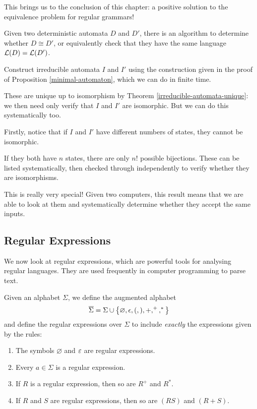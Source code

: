 \documentclass{article}
\begin{document}
This brings us to the conclusion of this chapter: a positive solution to the equivalence problem for regular grammars!

\begin{theorem}
	Given two deterministic automata $D$ and $D'$, there is an algorithm to determine whether $D \cong D'$, or equivalently check that they have the same language $\mathcal{L}(D) = \mathcal{L}(D')$.
\end{theorem}

\begin{prf}
	Construct irreducible automata $I$ and $I'$ using the construction given in the proof of Proposition \ref{minimal-automaton}, which we can do in finite time.
	    
	These are unique up to isomorphism by Theorem \ref{irreducible-automata-unique}: we then need only verify that $I$ and $I'$ are isomorphic. But we can do this systematically too.
	    
	Firstly, notice that if $I$ and $I'$ have different numbers of states, they cannot be isomorphic.
	    
	If they both have $n$ states, there are only $n!$ possible bijections. These can be listed systematically, then checked through independently to verify whether they are isomorphisms.
\end{prf}

\begin{note}
	This is really very special! Given two computers, this result means that we are able to look at them and systematically determine whether they accept the same inputs.
\end{note}

\subsection{Regular Expressions}

We now look at regular expressions, which are powerful tools for analysing regular languages. They are used frequently in computer programming to parse text.

\begin{definition}
	Given an alphabet $\Sigma$, we define the augmented alphabet
	\[
		\overline \Sigma = \Sigma \cup \left\lbrace \varnothing, \epsilon, (, ), +, ^+, ^* \right\rbrace
	\]
	and define the regular expressions over $\Sigma$ to include \textit{exactly} the expressions given by the rules:
	\begin{enumerate}
		\item The symbols $\varnothing$ and $\varepsilon$ are regular expressions.
		\item Every $a \in \Sigma$ is a regular expression.
		\item If $R$ is a regular expression, then so are $R^+$ and $R^*$.
		\item If $R$ and $S$ are regular expressions, then so are $(RS)$ and $(R+S)$.
	\end{enumerate}
\end{definition}
\end{document}
